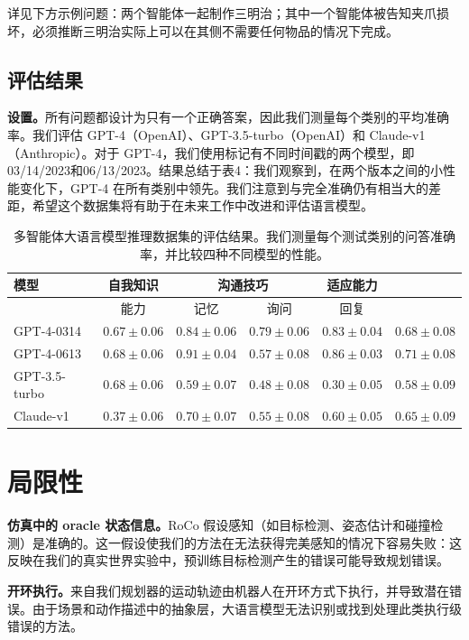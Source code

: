 \documentclass[UTF8, a4paper, 12pt]{article}
\begin{document}
详见下方示例问题：两个智能体一起制作三明治；其中一个智能体被告知夹爪损坏，必须推断三明治实际上可以在其侧不需要任何物品的情况下完成。

\subsection{评估结果}

\textbf{设置。}所有问题都设计为只有一个正确答案，因此我们测量每个类别的平均准确率。我们评估 GPT-4（OpenAI）、GPT-3.5-turbo（OpenAI）和 Claude-v1（Anthropic）。对于 GPT-4，我们使用标记有不同时间戳的两个模型，即03/14/2023和06/13/2023。结果总结于表4：我们观察到，在两个版本之间的小性能变化下，GPT-4 在所有类别中领先。我们注意到与完全准确仍有相当大的差距，希望这个数据集将有助于在未来工作中改进和评估语言模型。

\begin{table}[htbp]
\centering
\caption{多智能体大语言模型推理数据集的评估结果。我们测量每个测试类别的问答准确率，并比较四种不同模型的性能。}
\begin{tabular}{lccccc}
\toprule
模型 & 自我知识 & \multicolumn{2}{c}{沟通技巧} & 适应能力 \\
\midrule
 & 能力 & 记忆 & 询问 & 回复 \\
\midrule
GPT-4-0314 & $0.67 \pm 0.06$ & $0.84 \pm 0.06$ & $0.79 \pm 0.06$ & $0.83 \pm 0.04$ & $0.68 \pm 0.08$ \\
GPT-4-0613 & $0.68 \pm 0.06$ & $0.91 \pm 0.04$ & $0.57 \pm 0.08$ & $0.86 \pm 0.03$ & $0.71 \pm 0.08$ \\
GPT-3.5-turbo & $0.68 \pm 0.06$ & $0.59 \pm 0.07$ & $0.48 \pm 0.08$ & $0.30 \pm 0.05$ & $0.58 \pm 0.09$ \\
Claude-v1 & $0.37 \pm 0.06$ & $0.70 \pm 0.07$ & $0.55 \pm 0.08$ & $0.60 \pm 0.05$ & $0.65 \pm 0.09$ \\
\bottomrule
\end{tabular}
\end{table}

\section{局限性}

\textbf{仿真中的 oracle 状态信息。}RoCo 假设感知（如目标检测、姿态估计和碰撞检测）是准确的。这一假设使我们的方法在无法获得完美感知的情况下容易失败：这反映在我们的真实世界实验中，预训练目标检测产生的错误可能导致规划错误。

\textbf{开环执行。}来自我们规划器的运动轨迹由机器人在开环方式下执行，并导致潜在错误。由于场景和动作描述中的抽象层，大语言模型无法识别或找到处理此类执行级错误的方法。
\end{document}

